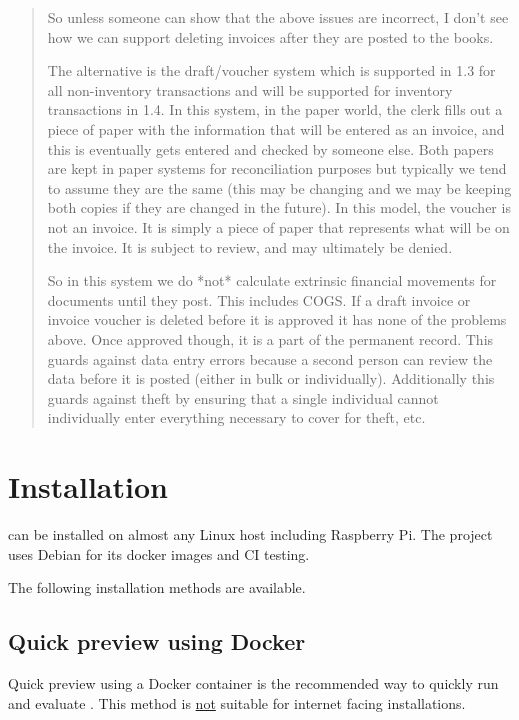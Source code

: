 \begin{quote}
So unless someone can show that the above issues are incorrect, I don't see how we can support deleting invoices after they are posted to the books.

The alternative is the draft/voucher system which is supported in 1.3 for all non-inventory transactions and will be supported for inventory transactions in 1.4.  In this system, in the paper world, the clerk fills out a piece of paper with the information that will be entered as an invoice, and this is eventually gets entered and checked by someone else.  Both papers are kept in paper systems for reconciliation purposes but typically we tend to assume they are the same (this may be changing and we may be keeping both copies if they are changed in the future).  In this model, the voucher is not an invoice.  It is simply a piece of paper that represents what will be on the invoice.  It is subject to review, and may ultimately be denied.

So in this system we do *not* calculate extrinsic financial movements for documents until they post.  This includes COGS.  If a draft invoice or invoice voucher is deleted before it is approved it has none of the problems above.  Once approved though, it is a part of the permanent record.  This guards against data entry errors because a second person can review the data  before it is posted (either in bulk or individually).   Additionally this guards against theft by ensuring that a single individual cannot individually enter everything necessary to cover for theft, etc.
\end{quote}

\chapter{Installation}
\label{app-installation}

\lsmbsp  can be installed on almost any Linux host including Raspberry Pi. The project uses Debian for its docker images and \gls{CI} testing.  

The following installation methods are available.

\section{Quick preview using Docker}
\label{sec-installation-docker-preview}

Quick preview using a Docker container is the recommended way to quickly run and evaluate \lsmb. 
This method is \underline{not} suitable for internet facing installations.

